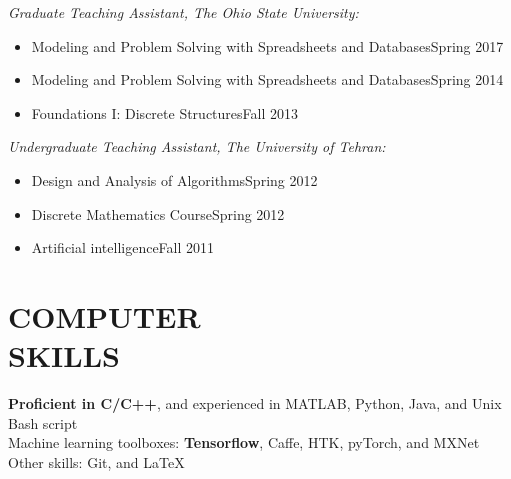 \documentclass[margin, 10pt]{res}
\begin{document}
\begin{resume}
\textit{Graduate Teaching Assistant, The Ohio State University:}
\begin{itemize}
\item Modeling and Problem Solving with Spreadsheets and Databases\hfill Spring 2017
\item Modeling and Problem Solving with Spreadsheets and Databases\hfill Spring 2014 
\item Foundations I: Discrete Structures\hfill Fall 2013
\end{itemize}
\textit{Undergraduate Teaching Assistant, The University of Tehran:}
\begin{itemize}
\item Design and Analysis of Algorithms\hfill Spring 2012 
\item Discrete Mathematics Course\hfill Spring 2012
\item Artificial intelligence\hfill Fall 2011
\end{itemize}

\section{COMPUTER \\ SKILLS}
\textbf{Proficient in C/C++}, and experienced in MATLAB, Python, Java, and Unix Bash script\\
Machine learning toolboxes: \textbf{Tensorflow},
Caffe, HTK, pyTorch, and MXNet\\
Other skills: Git, and \LaTeX

\end{resume}
\end{document}
